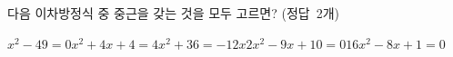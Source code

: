 다음 이차방정식 중 중근을 갖는 것을 모두 고르면? \mbox{(정답 2개)}
\begin{choices32}{$x^2-49=0$}{$x^2+4x+4=4$}{$x^2+36=-12x$}{$2x^2-9x+10=0$}{$16x^2-8x+1=0$}\end{choices32}

